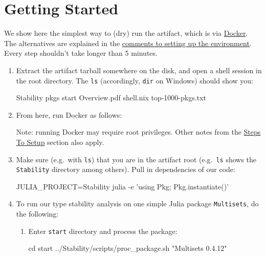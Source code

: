\documentclass[
]{article}
\author{}
\date{}
\begin{document}
\hypertarget{getting-started}{%
\section{Getting Started}\label{getting-started}}

We show here the simplest way to (dry) run the artifact, which is via
\href{https://docs.docker.com/get-docker/}{Docker}. The alternatives are
explained in the
\protect\hyperlink{comments-on-setting-up-environment}{comments to
setting up the environment}. Every step shouldn't take longer than 5
minutes.

\begin{enumerate}
\def\labelenumi{\arabic{enumi}.}
\item
  Extract the artifact tarball somewhere on the disk, and open a shell
  session in the root directory. The \texttt{ls} (accordingly,
  \texttt{dir} on Windows) should show you:

\begin{verbnobox}[\small]
Stability    pkgs    start    Overview.pdf    shell.nix    top-1000-pkgs.txt
\end{verbnobox}
\item
  From here, run Docker as follows:


  Note: running Docker may require root privileges. Other notes from the
  \protect\hyperlink{steps-to-setup}{Steps To Setup} section also apply.
\item
  Make sure (e.g.~with \texttt{ls}) that you are in the artifact root
  (e.g.~\texttt{ls} shows the \texttt{Stability} directory among
  others). Pull in dependencies of our code:

\begin{verbnobox}[\small]
JULIA_PROJECT=Stability julia -e 'using Pkg; Pkg.instantiate()'
\end{verbnobox}
\item
  To run our type stability analysis on one simple Julia package
  \texttt{Multisets}, do the following:

  \begin{enumerate}
  \def\labelenumii{\alph{enumii}.}
  \item
    Enter \texttt{start} directory and process the package:

\begin{verbnobox}[\small]
cd start
../Stability/scripts/proc_package.sh "Multisets 0.4.12"
\end{verbnobox}


\end{enumerate}
\end{enumerate}
\end{document}
